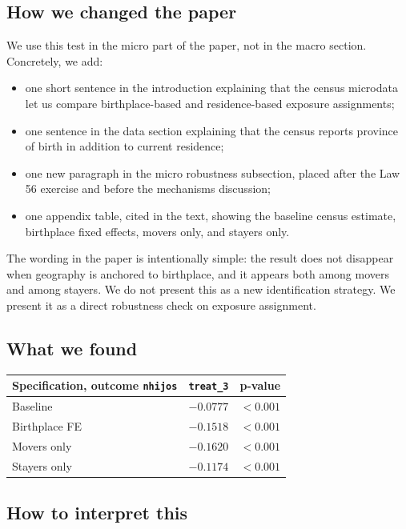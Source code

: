 \documentclass[11pt]{article}
\begin{document}
\subsection*{How we changed the paper}

We use this test in the micro part of the paper, not in the macro section. Concretely, we add:
\begin{itemize}[leftmargin=*]
\item one short sentence in the introduction explaining that the census microdata let us compare birthplace-based and residence-based exposure assignments;
\item one sentence in the data section explaining that the census reports province of birth in addition to current residence;
\item one new paragraph in the micro robustness subsection, placed after the Law 56 exercise and before the mechanisms discussion;
\item one appendix table, cited in the text, showing the baseline census estimate, birthplace fixed effects, movers only, and stayers only.
\end{itemize}

The wording in the paper is intentionally simple: the result does not disappear when geography is anchored to birthplace, and it appears both among movers and among stayers. We do not present this as a new identification strategy. We present it as a direct robustness check on exposure assignment.

\subsection*{What we found}

\begin{center}
\begin{tabular}{lcc}
\toprule
Specification, outcome \texttt{nhijos} & \texttt{treat\_3} & p-value \\
\midrule
Baseline & $-0.0777$ & $< 0.001$ \\
Birthplace FE & $-0.1518$ & $< 0.001$ \\
Movers only & $-0.1620$ & $< 0.001$ \\
Stayers only & $-0.1174$ & $< 0.001$ \\
\bottomrule
\end{tabular}
\end{center}

\subsection*{How to interpret this}
\end{document}
